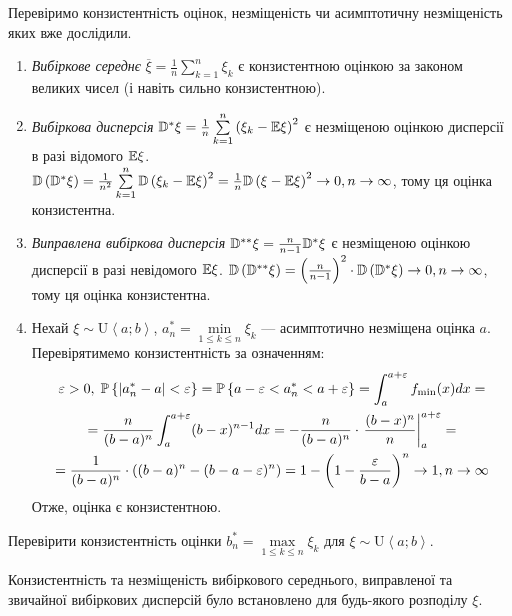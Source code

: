 \begin{example}
    Перевіримо конзистентність оцінок, незміщеність чи асимптотичну незміщеність яких вже дослідили.
    \begin{enumerate}
        \item \emph{Вибіркове середнє} $\overline{\xi} = \frac{1}{n}\sum\limits_{k=1}^n \xi_k$ є конзистентною оцінкою
        за законом великих чисел (і навіть сильно конзистентною).
        \item \emph{Вибіркова дисперсія} $\D^*\xi = \frac{1}{n}\sum\limits_{k=1}^n \left(\xi_k - \E\xi \right)^2$
        є незміщеною оцінкою дисперсії в разі відомого $\E\xi$. 
        $\D\left(\D^*\xi\right) = \frac{1}{n^2}\sum\limits_{k=1}^n \D\left(\xi_k - \E\xi \right)^2 =
        \frac{1}{n} \D\left(\xi - \E\xi \right)^2 \to 0, n\to\infty$, тому ця оцінка конзистентна.
        \item \emph{Виправлена вибіркова дисперсія} $\D^{**}\xi = \frac{n}{n-1} \D^*\xi$ є незміщеною оцінкою дисперсії в разі невідомого $\E\xi$. 
        $\D\left(\D^{**}\xi\right) = \left(\frac{n}{n-1} \right)^2 \cdot \D\left(\D^*\xi\right) \to 0, n\to\infty$, тому ця оцінка конзистентна.
        \item Нехай $\xi \sim \mathrm{U}\left< a; b\right>$, $a^*_n = \underset{1\leq k \leq n}{\min}\xi_k$ --- асимптотично незміщена оцінка $a$.
        Перевірятимемо конзистентність за означенням:
        \begin{gather*}
            \varepsilon > 0, \; \P\left\{|a^*_n - a| < \varepsilon\right\} = 
            \P\left\{a - \varepsilon < a^*_n < a + \varepsilon\right\} = \int_{a}^{a+\varepsilon} f_{\min}(x) dx = \\
            = \frac{n}{(b-a)^n}\int_{a}^{a+\varepsilon} (b-x)^{n-1} dx =
            -\frac{n}{(b-a)^n} \cdot \left. \frac{(b-x)^n}{n} \right|_{a}^{a+\varepsilon} = \\
            = \frac{1}{(b-a)^n} \cdot \left( (b-a)^n  - (b-a-\varepsilon)^n\right) = 
            1 - \left(1 - \frac{\varepsilon}{b-a}\right)^n \to 1, n\to\infty
        \end{gather*} 
        Отже, оцінка є конзистентною.
    \end{enumerate}
\end{example}
\begin{exercise}
    Перевірити конзистентність оцінки $b^*_n = \underset{1\leq k \leq n}{\max}\xi_k$ для $\xi \sim \mathrm{U}\left< a; b\right>$.
\end{exercise}
\begin{remark}
    Конзистентність та незміщеність вибіркового середнього, виправленої та звичайної вибіркових дисперсій було встановлено для будь-якого розподілу $\xi$.
\end{remark}


